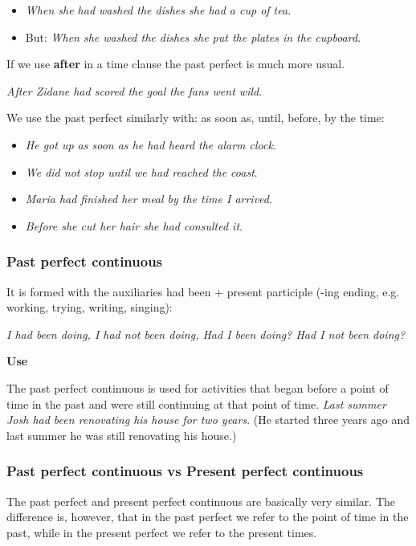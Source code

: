 \begin{itemize}
\item \textit{When she had washed the dishes she had a cup of tea}.
\item But: \textit{When she washed the dishes she put the plates in the cupboard}.
\end{itemize}

If we use \textbf{after} in a time clause the past perfect is much more usual. 

\textit{After Zidane had scored the goal the fans went wild}.

We use the past perfect similarly with: as soon as, until, before, by the time:

\begin{itemize}
\item \textit{He got up as soon as he had heard the alarm clock}.
\item \textit{We did not stop until we had reached the coast}.
\item \textit{Maria had finished her meal by the time I arrived}.
\item \textit{Before she cut her hair she had consulted it}.
\end{itemize}

\subsubsection{Past perfect continuous}

It is formed with the auxiliaries had been + present participle (-ing ending, e.g. working, trying, writing, singing):

\textit{I had been doing, I had not been doing, Had I been doing? Had I not been doing?}

\textbf{Use}

The past perfect continuous is used for activities that began before a point of time in the past and were still continuing at that point of time. \textit{Last summer Josh had been renovating his house for two years}. (He started three years ago and last summer he was still renovating his house.)

\subsubsection{Past perfect continuous vs Present perfect continuous}

The past perfect and present perfect continuous are basically very similar. The difference is, however, that in the past perfect we refer to the point of time in the past, while in the present perfect we refer to the present times. 

